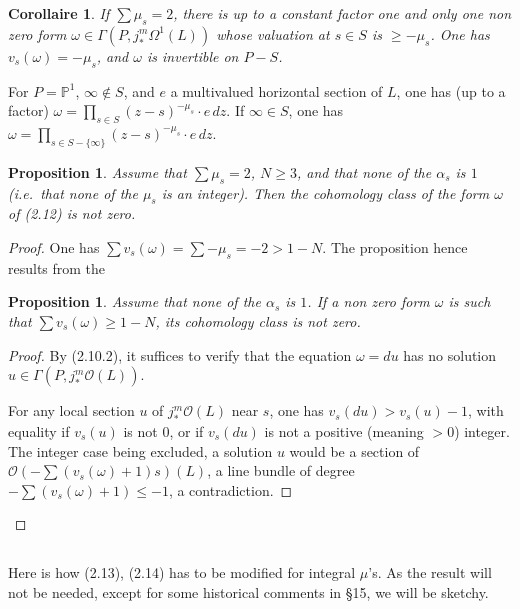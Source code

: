 \documentclass[12pt,a4paper]{article}
\theoremstyle{plain}
\newtheorem{proposition}[theorem]{Proposition}
\newtheorem{corollary}[theorem]{Corollaire}
\theoremstyle{definition}
\theoremstyle{remark}
\newcommand{\PP}{\mathbb{P}}
\numberwithin{equation}{section}
\providecommand{\PP}{\mathbb{P}}
\begin{document}
\begin{corollary}\label{cor:2.12}
If $\sum \mu_s = 2$, there is up to a constant factor one and only one non zero form $\omega \in \Gamma(P, j_*^m \Omega^1(L))$ whose valuation at $s \in S$ is $\geq -\mu_s$. One has $v_s(\omega) = -\mu_s$, and $\omega$ is invertible on $P-S$.
\end{corollary}

For $P = \PP^1$, $\infty \notin S$, and $e$ a multivalued horizontal section of $L$, one has (up to a factor) $\omega = \prod_{s \in S} (z-s)^{-\mu_s} \cdot e \, dz$. If $\infty \in S$, one has $\omega = \prod_{s \in S - \{\infty\}} (z-s)^{-\mu_s} \cdot e \, dz$.

\begin{proposition}\label{prop:2.13}
Assume that $\sum \mu_s = 2$, $N \geq 3$, and that none of the $\alpha_s$ is $1$ (i.e.\ that none of the $\mu_s$ is an integer). Then the cohomology class of the form $\omega$ of (2.12) is not zero.
\end{proposition}

\begin{proof}
One has $\sum v_s(\omega) = \sum -\mu_s = -2 > 1-N$. The proposition hence results from the
\begin{proposition}\label{prop:2.14}
Assume that none of the $\alpha_s$ is $1$. If a non zero form $\omega$ is such that $\sum v_s(\omega) \geq 1 - N$, its cohomology class is not zero.
\end{proposition}
\begin{proof}
By (2.10.2), it suffices to verify that the equation $\omega = du$ has no solution $u \in \Gamma(P, j_*^m \mathcal{O}(L))$.

For any local section $u$ of $j_*^m \mathcal{O}(L)$ near $s$, one has $v_s(du) > v_s(u) - 1$, with equality if $v_s(u)$ is not $0$, or if $v_s(du)$ is not a positive (meaning $> 0$) integer. The integer case being excluded, a solution $u$ would be a section of $\mathcal{O}(-\sum (v_s(\omega)+1)s)(L)$, a line bundle of degree $-\sum(v_s(\omega)+1) \leq -1$, a contradiction.
\end{proof}
\end{proof}

\subsection{}
Here is how (2.13), (2.14) has to be modified for integral $\mu$'s. As the result will not be needed, except for some historical comments in \S 15, we will be sketchy.
\end{document}
